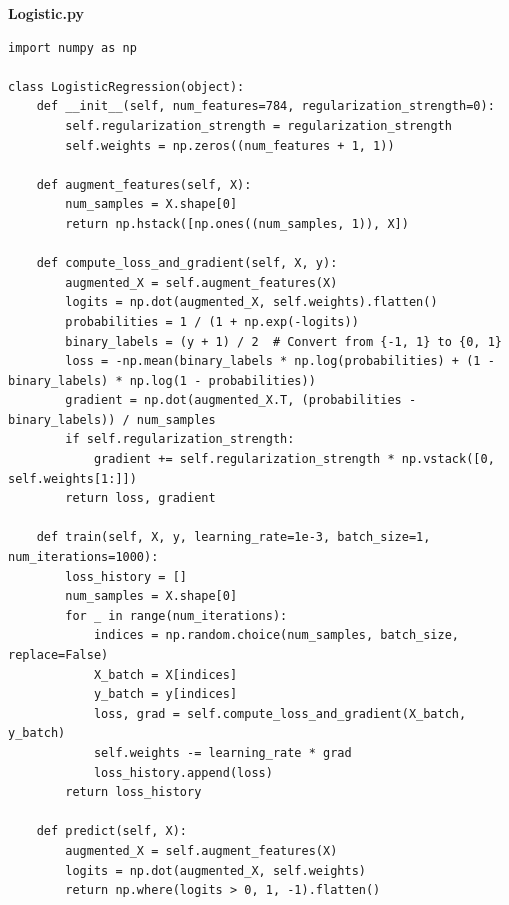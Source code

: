 \documentclass[letterpaper]{article}
\theoremstyle{definition}
\begin{document}
\textbf{Logistic.py}
\begin{verbatim}
import numpy as np

class LogisticRegression(object):
    def __init__(self, num_features=784, regularization_strength=0):
        self.regularization_strength = regularization_strength
        self.weights = np.zeros((num_features + 1, 1))

    def augment_features(self, X):
        num_samples = X.shape[0]
        return np.hstack([np.ones((num_samples, 1)), X])

    def compute_loss_and_gradient(self, X, y):
        augmented_X = self.augment_features(X)
        logits = np.dot(augmented_X, self.weights).flatten()
        probabilities = 1 / (1 + np.exp(-logits))
        binary_labels = (y + 1) / 2  # Convert from {-1, 1} to {0, 1}
        loss = -np.mean(binary_labels * np.log(probabilities) + (1 - binary_labels) * np.log(1 - probabilities))
        gradient = np.dot(augmented_X.T, (probabilities - binary_labels)) / num_samples
        if self.regularization_strength:
            gradient += self.regularization_strength * np.vstack([0, self.weights[1:]])
        return loss, gradient

    def train(self, X, y, learning_rate=1e-3, batch_size=1, num_iterations=1000):
        loss_history = []
        num_samples = X.shape[0]
        for _ in range(num_iterations):
            indices = np.random.choice(num_samples, batch_size, replace=False)
            X_batch = X[indices]
            y_batch = y[indices]
            loss, grad = self.compute_loss_and_gradient(X_batch, y_batch)
            self.weights -= learning_rate * grad
            loss_history.append(loss)
        return loss_history

    def predict(self, X):
        augmented_X = self.augment_features(X)
        logits = np.dot(augmented_X, self.weights)
        return np.where(logits > 0, 1, -1).flatten()
\end{verbatim}
\end{document}
